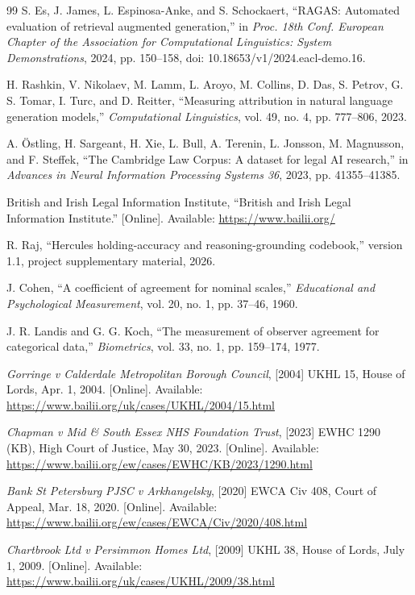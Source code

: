 \documentclass[conference]{IEEEtran}
\begin{document}
\begin{thebibliography}{99}
S. Es, J. James, L. Espinosa-Anke, and S. Schockaert, ``RAGAS: Automated evaluation of retrieval augmented generation,'' in \textit{Proc. 18th Conf. European Chapter of the Association for Computational Linguistics: System Demonstrations}, 2024, pp. 150--158, doi: 10.18653/v1/2024.eacl-demo.16.

H. Rashkin, V. Nikolaev, M. Lamm, L. Aroyo, M. Collins, D. Das, S. Petrov, G. S. Tomar, I. Turc, and D. Reitter, ``Measuring attribution in natural language generation models,'' \textit{Computational Linguistics}, vol. 49, no. 4, pp. 777--806, 2023.

A. \"{O}stling, H. Sargeant, H. Xie, L. Bull, A. Terenin, L. Jonsson, M. Magnusson, and F. Steffek, ``The Cambridge Law Corpus: A dataset for legal AI research,'' in \textit{Advances in Neural Information Processing Systems 36}, 2023, pp. 41355--41385.

British and Irish Legal Information Institute, ``British and Irish Legal Information Institute.'' [Online]. Available: \url{https://www.bailii.org/}

R. Raj, ``Hercules holding-accuracy and reasoning-grounding codebook,'' version 1.1, project supplementary material, 2026.

J. Cohen, ``A coefficient of agreement for nominal scales,'' \textit{Educational and Psychological Measurement}, vol. 20, no. 1, pp. 37--46, 1960.

J. R. Landis and G. G. Koch, ``The measurement of observer agreement for categorical data,'' \textit{Biometrics}, vol. 33, no. 1, pp. 159--174, 1977.

\textit{Gorringe v Calderdale Metropolitan Borough Council}, [2004] UKHL 15, House of Lords, Apr. 1, 2004. [Online]. Available: \url{https://www.bailii.org/uk/cases/UKHL/2004/15.html}

\textit{Chapman v Mid \& South Essex NHS Foundation Trust}, [2023] EWHC 1290 (KB), High Court of Justice, May 30, 2023. [Online]. Available: \url{https://www.bailii.org/ew/cases/EWHC/KB/2023/1290.html}

\textit{Bank St Petersburg PJSC v Arkhangelsky}, [2020] EWCA Civ 408, Court of Appeal, Mar. 18, 2020. [Online]. Available: \url{https://www.bailii.org/ew/cases/EWCA/Civ/2020/408.html}

\textit{Chartbrook Ltd v Persimmon Homes Ltd}, [2009] UKHL 38, House of Lords, July 1, 2009. [Online]. Available: \url{https://www.bailii.org/uk/cases/UKHL/2009/38.html}


\end{thebibliography}
\end{document}

